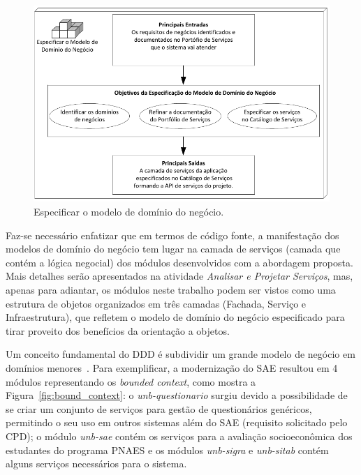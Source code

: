 \begin{figure}[htb]
\centering
\includegraphics[scale=1]{img/processo/dominio_negocio.pdf}
\caption{Especificar o modelo de domínio do negócio.}
\label{fig:dominio_negocio}
\end{figure}

Faz-se necessário enfatizar
que em termos de código fonte, 
a manifestação dos modelos 
de domínio do negócio tem lugar
na camada de serviços (camada que contém a lógica negocial)
dos módulos desenvolvidos com a abordagem proposta.
Mais detalhes serão 
apresentados
na atividade \emph{Analisar e Projetar Serviços},
mas, apenas para adiantar, 
os módulos neste trabalho podem ser vistos
como uma estrutura 
de objetos 
organizados em três camadas (Fachada, Serviço e Infraestrutura),
que refletem o modelo de domínio do negócio
especificado
para tirar proveito
dos benefícios da orientação a objetos.



Um conceito fundamental do \acrshort{DDD}
é subdividir
um grande modelo de negócio
em domínios menores~\cite{evans2004domain}. 
Para exemplificar, 
a modernização
do \acrshort{SAE} resultou em 4 
módulos representando
os \textit{bounded context}, 
como mostra a Figura~\ref{fig:bound_context}: o \emph{unb-questionario}   
surgiu devido a possibilidade de se criar um conjunto de serviços para
gestão de questionários genéricos, permitindo o seu uso em outros sistemas
além do \acrshort{SAE} (requisito solicitado pelo CPD); o módulo
\emph{unb-sae} contém os serviços para a
avaliação socioeconômica dos estudantes do programa \acrshort{PNAES} e os
módulos \emph{unb-sigra} e \emph{unb-sitab} contém
alguns serviços necessários para o sistema.


